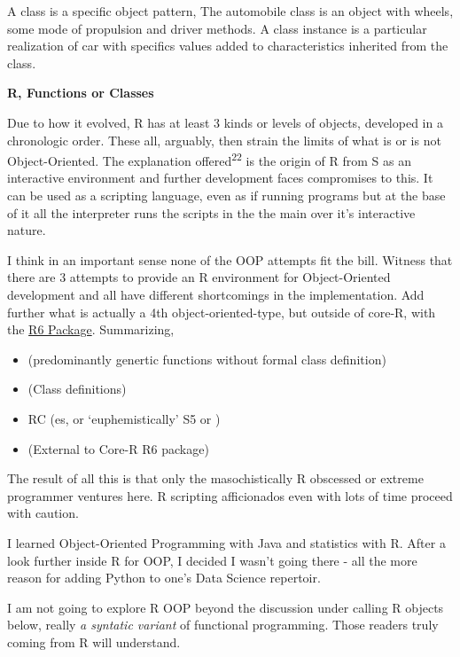 \documentclass[]{book}
\providecommand{\tightlist}{%
  \setlength{\itemsep}{0pt}\setlength{\parskip}{0pt}}
\theoremstyle{definition}
\theoremstyle{definition}
\theoremstyle{definition}
\theoremstyle{remark}
\begin{document}
A class is a specific object pattern, The automobile class is an object
with wheels, some mode of propulsion and driver methods. A class
instance is a particular realization of car with specifics values added
to characteristics inherited from the class.

\textbf{R, Functions or Classes}

Due to how it evolved, R has at least 3 kinds or levels of objects,
developed in a chronologic order. These all, arguably, then strain the
limits of what is or is not Object-Oriented. The explanation
offered\textsuperscript{22} is the origin of R from S as an interactive
environment and further development faces compromises to this. It can be
used as a scripting language, even as if running programs but at the
base of it all the interpreter runs the scripts in the the main over
it's interactive nature.

I think in an important sense none of the OOP attempts fit the bill.
Witness that there are 3 attempts to provide an R environment for
Object-Oriented development and all have different shortcomings in the
implementation. Add further what is actually a 4th object-oriented-type,
but outside of core-R, with the \href{https://github.com/r-lib/R6/}{R6
Package}. Summarizing,

\begin{itemize}
\tightlist
\item
   (predominantly genertic functions without formal class
  definition)
\item
   (Class definitions)
\item
  RC (es, or `euphemistically' S5 or )
\item
   (External to Core-R R6 package)
\end{itemize}

The result of all this is that only the masochistically R obscessed or
extreme programmer ventures here. R scripting afficionados even with
lots of time proceed with caution.

I learned Object-Oriented Programming with Java and statistics with R.
After a look further inside R for OOP, I decided I wasn't going there -
all the more reason for adding Python to one's Data Science repertoir.

I am not going to explore R OOP  beyond the discussion
under calling R objects below, really \emph{a syntatic variant} of
functional programming. Those readers truly coming from R will
understand. 
\end{document}
